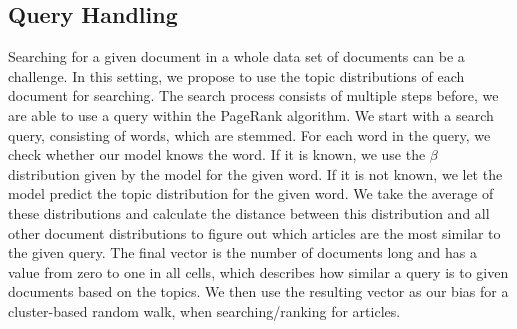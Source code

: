 \subsection{Query Handling}
Searching for a given document in a whole data set of documents can be a challenge. 
In this setting, we propose to use the topic distributions of each document for searching.
The search process consists of multiple steps before, we are able to use a query within the PageRank algorithm. 
We start with a search query, consisting of words, which are stemmed.
For each word in the query, we check whether our model knows the word.
If it is known, we use the $\beta$ distribution given by the model for the given word. 
If it is not known, we let the model predict the topic distribution for the given word.
We take the average of these distributions and calculate the distance between this distribution and all other document distributions to figure out which articles are the most similar to the given query.
The final vector is the number of documents long and has a value from zero to one in all cells, which describes how similar a query is to given documents based on the topics.
We then use the resulting vector as our bias for a cluster-based random walk, when searching/ranking for articles.
 
